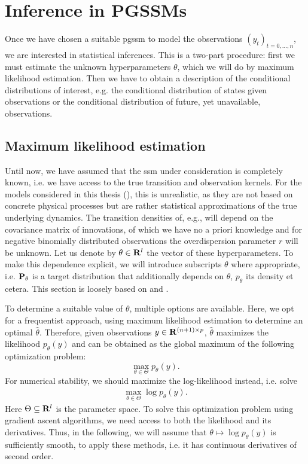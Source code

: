 \section{Inference in PGSSMs}
\label{sec:maximum_likelihood_estimation}

Once we have chosen a suitable \acrshort{pgssm} to model the observations $\left( y_{t} \right)_{t = 0, \dots, n}$, we are interested in statistical inferences. This is a two-part procedure: first we must estimate the unknown hyperparameters $\theta$, which we will do by maximum likelihood estimation. Then we have to obtain a description of the conditional distributions of interest, e.g. the conditional distribution of states given observations or the conditional distribution of future, yet unavailable, observations. 

\subsection{Maximum likelihood estimation}
Until now, we have assumed that the \acrshort{ssm} under consideration is completely known, i.e. we have access to the true transition and observation kernels. For the models considered in this thesis (), this is unrealistic, as they are not based on concrete physical processes but are rather statistical approximations of the true underlying dynamics. The transition densities of, e.g.,  will depend on the covariance matrix of innovations, of which we have no a priori knowledge and for negative binomially distributed observations the overdispersion parameter $r$ will be unknown. Let us denote by $\theta\in\R^{l}$ the vector of these hyperparameters. 
To make this dependence explicit, we will introduce subscripts $\theta$ where appropriate, i.e. $\P_{\theta}$ is a target distribution that additionally depends on $\theta$, $p_{\theta}$ its density et cetera. This section is loosely based on \citep[Chapter 7 \& 11]{Durbin2012Time} and \citep[Chapter 14]{Chopin2020Introduction}.

To determine a suitable value of $\theta$, multiple options are available. Here, we opt for a frequentist approach, using maximum likelihood estimation to determine an optimal $\hat \theta$. Therefore, given observations $y\in\R^{(n+1)\times p}$, $\hat\theta$ maximizes the likelihood $p_{\theta}(y)$ and can be obtained as the global maximum of the following optimization problem: 
$$
    \max_{\theta \in \Theta} p_{\theta}(y).
$$
For numerical stability, we should maximize the log-likelihood instead, i.e. solve 
\begin{align}
    \label{eq:max-log-p}
    \max_{\theta \in \Theta} \log p_{\theta}(y).
\end{align}
Here $\Theta \subseteq \R^{l}$ is the parameter space. To solve this optimization problem using gradient ascent algorithms, we need access to both the likelihood and its derivatives. Thus, in the following, we will assume that $\theta \mapsto \log p_{\theta}(y)$ is sufficiently smooth, to apply these methods, i.e. it has continuous derivatives of second order. 


